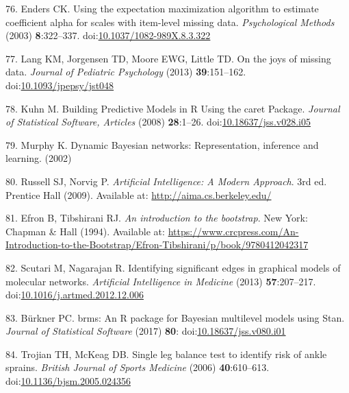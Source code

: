 \documentclass[
  english,
  man]{apa6}
\newenvironment{cslreferences}%
  {}%
  {\par}
\begin{document}
\begin{cslreferences}
\leavevmode\hypertarget{ref-Enders2003}{}%
76. Enders CK. Using the expectation maximization algorithm to estimate coefficient alpha for scales with item-level missing data. \emph{Psychological Methods} (2003) \textbf{8}:322--337. doi:\href{https://doi.org/10.1037/1082-989X.8.3.322}{10.1037/1082-989X.8.3.322}

\leavevmode\hypertarget{ref-Lang2014}{}%
77. Lang KM, Jorgensen TD, Moore EWG, Little TD. On the joys of missing data. \emph{Journal of Pediatric Psychology} (2013) \textbf{39}:151--162. doi:\href{https://doi.org/10.1093/jpepsy/jst048}{10.1093/jpepsy/jst048}

\leavevmode\hypertarget{ref-Kuhn2008}{}%
78. Kuhn M. Building Predictive Models in R Using the caret Package. \emph{Journal of Statistical Software, Articles} (2008) \textbf{28}:1--26. doi:\href{https://doi.org/10.18637/jss.v028.i05}{10.18637/jss.v028.i05}

\leavevmode\hypertarget{ref-Murphy2002}{}%
79. Murphy K. Dynamic Bayesian networks: Representation, inference and learning. (2002)

\leavevmode\hypertarget{ref-Norvig2009}{}%
80. Russell SJ, Norvig P. \emph{Artificial Intelligence: A Modern Approach}. 3rd ed. Prentice Hall (2009). Available at: \url{http://aima.cs.berkeley.edu/}

\leavevmode\hypertarget{ref-Efron1993}{}%
81. Efron B, Tibshirani RJ. \emph{An introduction to the bootstrap}. New York: Chapman \& Hall (1994). Available at: \url{https://www.crcpress.com/An-Introduction-to-the-Bootstrap/Efron-Tibshirani/p/book/9780412042317}

\leavevmode\hypertarget{ref-Scutari2013}{}%
82. Scutari M, Nagarajan R. Identifying significant edges in graphical models of molecular networks. \emph{Artificial Intelligence in Medicine} (2013) \textbf{57}:207--217. doi:\href{https://doi.org/10.1016/j.artmed.2012.12.006}{10.1016/j.artmed.2012.12.006}

\leavevmode\hypertarget{ref-Burkner2017a}{}%
83. Bürkner PC. brms: An R package for Bayesian multilevel models using Stan. \emph{Journal of Statistical Software} (2017) \textbf{80}: doi:\href{https://doi.org/10.18637/jss.v080.i01}{10.18637/jss.v080.i01}

\leavevmode\hypertarget{ref-Trojian2006}{}%
84. Trojian TH, McKeag DB. Single leg balance test to identify risk of ankle sprains. \emph{British Journal of Sports Medicine} (2006) \textbf{40}:610--613. doi:\href{https://doi.org/10.1136/bjsm.2005.024356}{10.1136/bjsm.2005.024356}


\end{cslreferences}
\end{document}
